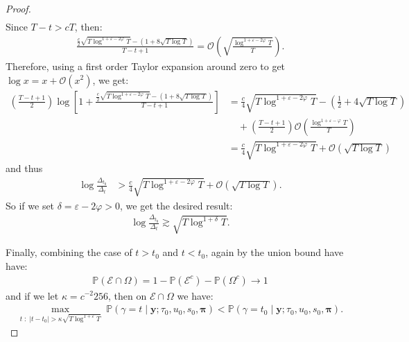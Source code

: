 \documentclass{article}
\begin{document}
\begin{proof}
\begin{align*}
\end{align*}
Since $T-t > cT$, then: 
\begin{align*}
    \frac{\frac{c}{2}\sqrt{T \log^{1 +\varepsilon-2\varphi} T} - (1 + 8\sqrt{T \log T})}{T-t+1} = \mathcal{O}\left(\sqrt{\frac{\log^{1 + \varepsilon-2\varphi} T}{T}}\right).
\end{align*}
Therefore, using a first order Taylor expansion around zero to get $\log x = x + \mathcal{O}(x^2)$, we get:
\begin{align*}
     \left(\frac{T - t + 1}{2}\right) \log\left[1 + \frac{\frac{c}{2}\sqrt{T \log^{1 +\varepsilon-2\varphi} T} - (1 + 8\sqrt{T \log T})}{T-t+1}\right] &= \frac{c}{4}\sqrt{T \log^{1 +\varepsilon-2\varphi} T} - \left(\frac{1}{2} + 4\sqrt{T \log T}\right)\\
     & \quad + \left(\frac{T - t + 1}{2}\right)\mathcal{O}\left(\frac{\log^{1 + \varepsilon-\varphi} T}{T}\right) \\
     &= \frac{c}{4}\sqrt{T \log^{1 +\varepsilon-2\varphi} T} + \mathcal{O}(\sqrt{T \log T})
\end{align*}
and thus 
\begin{align*}
    \log \frac{\Delta_{t_0}}{\Delta_t} &> \frac{c}{4}\sqrt{T \log^{1 +\varepsilon-2\varphi} T} + \mathcal{O}(\sqrt{T \log T}).
\end{align*}
So if we set $\delta = \varepsilon - 2\varphi > 0$, we get the desired result:
\begin{align*}
    \log \frac{\Delta_{t_0}}{\Delta_t} \gtrsim \sqrt{T\log^{1+\delta} T}.
\end{align*}

Finally, combining the case of $t > t_0$ and $t < t_0$, again by the union bound have have:
\begin{align*}
    \mathbb{P}(\mathcal{E} \cap \Omega) = 1 - \mathbb{P}(\mathcal{E}^c) -\mathbb{P}(\Omega^c) \to 1
\end{align*}
and if we let $\kappa = c^{-2}256$, then on $\mathcal{E} \cap \Omega$ we have:
\begin{align*}
    \max_{t \;:\; |t - t_0| > \kappa \sqrt{T\log^{1+\varepsilon} T}} \; \mathbb{P}(\gamma = t  \;|\; \mathbf{y} ; \tau_0, u_0, s_0,\pmb{\pi}) < \mathbb{P}(\gamma = t_0  \;|\; \mathbf{y} ; \tau_0, u_0, s_0,\pmb{\pi}).
\end{align*}

\end{proof}







\end{document}
